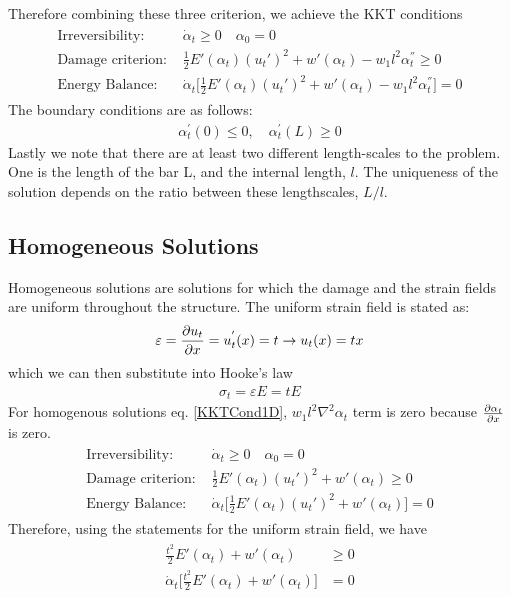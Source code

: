 \documentclass[12pt,3p]{article}
\numberwithin{equation}{section}
\begin{document}
Therefore combining these three criterion, we achieve the KKT conditions 
\begin{align}\label{KKTCond1D}
\begin{split}
\text{Irreversibility: }&
\dot{\alpha}_t \geq 0 \quad \alpha_{0} = 0 \\
\text{Damage criterion: }&
\frac{1}{2} E'(\alpha_t) (u_t')^2 + w'(\alpha_t) - w_1 l^2 \alpha_t^{''} \geq 0 \\
\text{Energy Balance: }&
\dot{\alpha}_t \bigg[ \frac{1}{2} E'(\alpha_t) (u_t')^2 + w'(\alpha_t) - w_1 l^2 \alpha_t^{''} \bigg] = 0 
\end{split}
\end{align}
The boundary conditions are as follows: 
\begin{align}
\alpha_{t}^{\prime}(0) \leq 0, \quad \alpha_{t}^{\prime}(L) \geq 0
\end{align}
Lastly we note that there are at least two different length-scales to the problem. One is the length of the bar L, and the internal length, $l$. The uniqueness of the solution depends on the ratio between these lengthscales, $L/l$. 

\subsection{Homogeneous Solutions}
Homogeneous solutions are solutions for which the damage and the strain fields are uniform throughout the structure. The uniform strain field is stated as: 
\begin{align*}
\varepsilon = \pdv{u_t}{x} = u_t^{'} (x) = t \rightarrow u_t(x) = t x
\end{align*}
which we can then substitute into Hooke's law
\begin{align*}
\sigma_t = \varepsilon E = t E 
\end{align*}
For homogenous solutions eq. \ref{KKTCond1D}, $w_1 l^2 \nabla^2 \alpha_t$ term is zero because $\pdv{\alpha_t}{x}$ is zero. 
\begin{align*}
\begin{split}
\text{Irreversibility: }&
\dot{\alpha}_t \geq 0 \quad \alpha_{0} = 0 \\
\text{Damage criterion: }&
\frac{1}{2} E'(\alpha_t) (u_t')^2 + w'(\alpha_t) \geq 0 \\
\text{Energy Balance: }&
\dot{\alpha}_t \bigg[ \frac{1}{2} E'(\alpha_t) (u_t')^2 + w'(\alpha_t) \bigg] = 0 
\end{split}
\end{align*}
Therefore, using the statements for the uniform strain field, we have 
\begin{align}\label{KKTHomogSol}
\begin{split}
\frac{t^2}{2} E'(\alpha_t) + w'(\alpha_t) &\geq 0 \\
\dot{\alpha}_t \bigg[ \frac{t^2}{2} E'(\alpha_t) + w'(\alpha_t) \bigg] &= 0 
\end{split}
\end{align}
\end{document}
